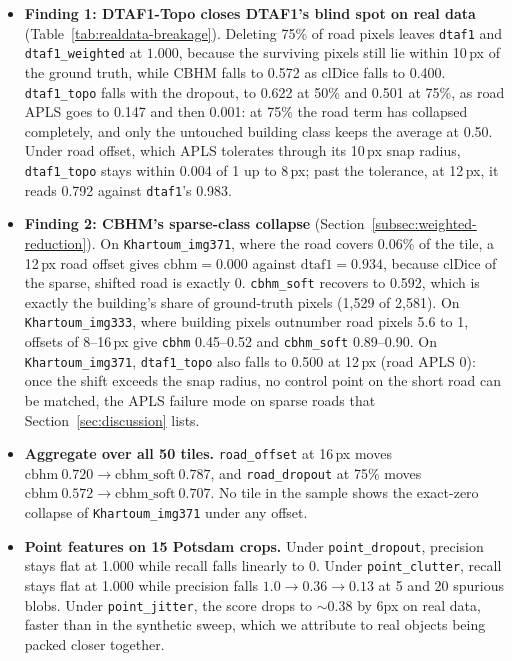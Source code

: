 \begin{itemize}
  \item \textbf{Finding 1: DTAF1-Topo closes DTAF1's blind spot on real data}
    (Table~\ref{tab:realdata-breakage}). Deleting 75\% of road pixels leaves \texttt{dtaf1} and
    \texttt{dtaf1\_weighted} at $1.000$, because the surviving pixels still lie within 10\,px of
    the ground truth, while CBHM falls to 0.572 as clDice falls to 0.400. \texttt{dtaf1\_topo}
    falls with the dropout, to 0.622 at 50\% and 0.501 at 75\%, as road APLS goes to 0.147 and
    then 0.001: at 75\% the road term has collapsed completely, and only the untouched building
    class keeps the average at 0.50. Under road offset, which APLS tolerates through its 10\,px snap
    radius, \texttt{dtaf1\_topo} stays within 0.004 of 1 up to 8\,px; past the tolerance, at 12\,px,
    it reads 0.792 against \texttt{dtaf1}'s 0.983.
  \item \textbf{Finding 2: CBHM's sparse-class collapse} (Section~\ref{subsec:weighted-reduction}).
    On \texttt{Khartoum\_img371}, where the road covers 0.06\% of the tile, a 12\,px road offset
    gives $\mathrm{cbhm}=0.000$ against $\mathrm{dtaf1}=0.934$, because clDice of the sparse,
    shifted road is exactly 0. \texttt{cbhm\_soft} recovers to 0.592, which is exactly the
    building's share of ground-truth pixels (1,529 of 2,581). On \texttt{Khartoum\_img333}, where
    building pixels outnumber road pixels 5.6 to 1, offsets of 8--16\,px give \texttt{cbhm}
    0.45--0.52 and \texttt{cbhm\_soft} 0.89--0.90. On \texttt{Khartoum\_img371},
    \texttt{dtaf1\_topo} also falls to 0.500 at 12\,px (road APLS 0): once the shift exceeds the
    snap radius, no control point on the short road can be matched, the APLS failure mode on
    sparse roads that Section~\ref{sec:discussion} lists.
  \item \textbf{Aggregate over all 50 tiles.} \texttt{road\_offset} at 16\,px moves
    $\mathrm{cbhm}\ 0.720 \to \mathrm{cbhm\_soft}\ 0.787$, and \texttt{road\_dropout} at 75\% moves
    $\mathrm{cbhm}\ 0.572 \to \mathrm{cbhm\_soft}\ 0.707$. No tile in the sample shows the
    exact-zero collapse of \texttt{Khartoum\_img371} under any offset.
  \item \textbf{Point features on 15 Potsdam crops.} Under \texttt{point\_dropout}, precision stays
    flat at 1.000 while recall falls linearly to 0. Under \texttt{point\_clutter}, recall stays
    flat at 1.000 while precision falls $1.0 \to 0.36 \to 0.13$ at 5 and 20 spurious blobs. Under
    \texttt{point\_jitter}, the score drops to ${\sim}0.38$ by 6px on real data, faster than in the
    synthetic sweep, which we attribute to real objects being packed closer together.
\end{itemize}

